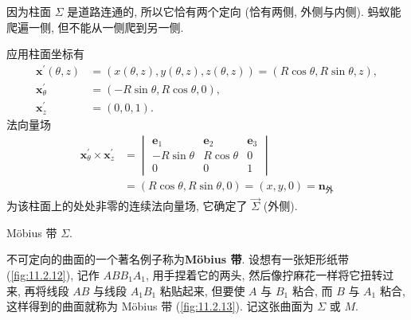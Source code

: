 \begin{figure}[htbp]
\begin{minipage}[b]{0.48\linewidth}
    \caption{}\label{fig:11.2.11}
  \end{minipage}
\end{figure}

因为柱面 $\Sigma$ 是道路连通的, 所以它恰有两个定向 (恰有两侧, 外侧与内侧). 蚂蚁能爬遍一侧, 但不能从一侧爬到另一侧.

应用柱面坐标有
\begin{align*}
  \boldsymbol{x}^{\prime}(\theta, z) &=(x(\theta, z), y(\theta, z), z(\theta, z))=(R \cos \theta, R \sin \theta, z), \\
  \boldsymbol{x}_{\theta}^{\prime} &=(-R \sin \theta, R \cos \theta, 0), \\
  \boldsymbol{x}_{z}^{\prime} &=(0,0,1).
\end{align*}
法向量场
\begin{align*}
  \boldsymbol{x}_{\theta}^{\prime} \times \boldsymbol{x}_{z}^{\prime}
  &=\begin{vmatrix}
      \boldsymbol{e}_{1} & \boldsymbol{e}_{2} & \boldsymbol{e}_{3} \\
      -R \sin \theta & R \cos \theta & 0 \\
      0 & 0 & 1
    \end{vmatrix} \\
  &=(R \cos \theta, R \sin \theta, 0)=(x, y, 0)=\boldsymbol{n}_{\text{外}}
\end{align*}
为该柱面上的处处非零的连续法向量场, 它确定了 $\overrightarrow{\Sigma}$ (外侧).

\begin{example}\label{ex:11.2.5}
Möbius 带 $\Sigma$.
\end{example}

不可定向的曲面的一个著名例子称为\textbf{Möbius 带}. 设想有一张矩形纸带 (\cref{fig:11.2.12}), 记作 $ABB_{1}A_{1}$, 用手捏着它的两头, 然后像拧麻花一样将它扭转过来, 再将线段 $AB$ 与线段 $A_{1}B_{1}$ 粘贴起来, 但要使 $A$ 与 $B_{1}$ 粘合, 而 $B$ 与 $A_{1}$ 粘合, 这样得到的曲面就称为 Möbius 带 (\cref{fig:11.2.13}). 记这张曲面为 $\Sigma$ 或 $M$.

